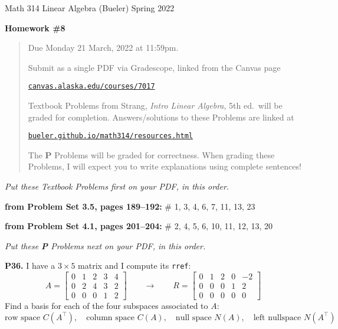 \documentclass[12pt]{amsart}
\newcommand{\prob}[1]{\bigskip\noindent\textbf{#1.}\quad }
\newcommand{\probset}[2]{\bigskip\noindent\textbf{from Problem Set #1, pages #2:}\quad }
\begin{document}
\scriptsize \noindent Math 314 Linear Algebra (Bueler) \hfill Spring 2022
\normalsize\medskip

\Large
\centerline{\textbf{Homework \#8}}

\normalsize
\bigskip
\begin{quote}
Due Monday 21 March, 2022 at 11:59pm.

\medskip
\noindent Submit as a single PDF via Gradescope, linked from the Canvas page

\href{https://canvas.alaska.edu/courses/7017}{\texttt{canvas.alaska.edu/courses/7017}}

\noindent Textbook Problems from Strang, \emph{Intro Linear Algebra}, 5th ed.~will be graded for completion.  Answers/solutions to these Problems are linked at

\href{https://bueler.github.io/math314/resources.html}{\texttt{bueler.github.io/math314/resources.html}}

\noindent The \textbf{P} Problems will be graded for correctness.  When grading these Problems, I will expect you to write explanations using complete sentences!
\end{quote}
\medskip

\thispagestyle{empty}

\noindent \hrulefill

\noindent \emph{Put these Textbook Problems first on your PDF, in this order.}

\probset{3.5}{189--192} \# 1, 3, 4, 6, 7, 11, 13, 23

\probset{4.1}{201--204} \# 2, 4, 5, 6, 10, 11, 12, 13, 20


\bigskip
\noindent \hrulefill

\noindent \emph{Put these \textbf{P} Problems next on your PDF, in this order.}

\prob{P36}  I have a $3\times 5$ matrix and I compute its \texttt{rref}:
    $$A = \begin{bmatrix} 0 & 1 & 2 & 3 & 4 \\
                          0 & 2 & 4 & 3 & 2 \\
                          0 & 0 & 0 & 1 & 2 \end{bmatrix}
      \qquad \to \qquad
      R = \begin{bmatrix} 0 & 1 & 2 & 0 & -2 \\
                          0 & 0 & 0 & 1 & 2 \\
                          0 & 0 & 0 & 0 & 0 \end{bmatrix}$$
Find a basis for each of the four subspaces associated to $A$:
    $$\text{row space } C(A^\top), \quad \text{column space } C(A), \quad \text{null space } N(A), \quad \text{left nullspace } N(A^\top)$$
\end{document}
